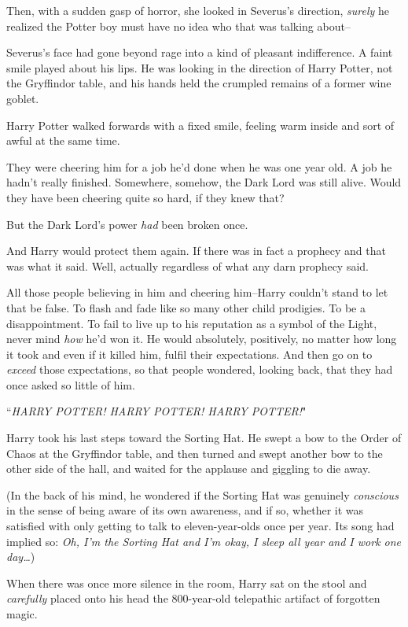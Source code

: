 Then, with a sudden gasp of horror, she looked in Severus's direction, \emph{surely} he realized the Potter boy must have no idea who that was talking about\---

Severus's face had gone beyond rage into a kind of pleasant indifference. A faint smile played about his lips. He was looking in the direction of Harry Potter, not the Gryffindor table, and his hands held the crumpled remains of a former wine goblet.

\later

Harry Potter walked forwards with a fixed smile, feeling warm inside and sort of awful at the same time.

They were cheering him for a job he'd done when he was one year old. A job he hadn't really finished. Somewhere, somehow, the Dark Lord was still alive. Would they have been cheering quite so hard, if they knew that?

But the Dark Lord's power \emph{had} been broken once.

And Harry would protect them again. If there was in fact a prophecy and that was what it said. Well, actually regardless of what any darn prophecy said.

All those people believing in him and cheering him\---Harry couldn't stand to let that be false. To flash and fade like so many other child prodigies. To be a disappointment. To fail to live up to his reputation as a symbol of the Light, never mind \emph{how} he'd won it. He would absolutely, positively, no matter how long it took and even if it killed him, fulfil their expectations. And then go on to \emph{exceed} those expectations, so that people wondered, looking back, that they had once asked so little of him.

``\emph{HARRY POTTER! HARRY POTTER! HARRY POTTER!}"

Harry took his last steps toward the Sorting Hat. He swept a bow to the Order of Chaos at the Gryffindor table, and then turned and swept another bow to the other side of the hall, and waited for the applause and giggling to die away.

(In the back of his mind, he wondered if the Sorting Hat was genuinely \emph{conscious} in the sense of being aware of its own awareness, and if so, whether it was satisfied with only getting to talk to eleven-year-olds once per year. Its song had implied so: \emph{Oh, I'm the Sorting Hat and I'm okay, I sleep all year and I work one day{\ldots}})

When there was once more silence in the room, Harry sat on the stool and \emph{carefully} placed onto his head the 800-year-old telepathic artifact of forgotten magic.

